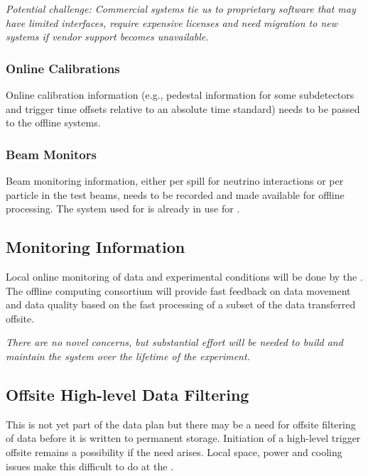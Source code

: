 \documentclass[../main-v1.tex]{subfiles}
\begin{document}
{\it Potential challenge: Commercial  systems tie us to proprietary software that may have limited interfaces, require expensive licenses and need migration to new systems if %
vendor support becomes unavailable.}

\subsubsection{Online Calibrations}
Online calibration information (e.g., pedestal information for some subdetectors and trigger time offsets relative to an absolute time standard) needs to be passed to the offline systems. 


\subsubsection{Beam Monitors}
Beam monitoring information, either per spill for neutrino interactions or per particle in the  test beams, needs to be recorded and made available for offline processing. 
The  system used for  is already in use for .

\subsection{Monitoring Information} 
Local online monitoring of data and experimental conditions will be done by the . %
The offline computing consortium will provide fast feedback on data movement and data quality based on the fast processing of a subset of the data transferred offsite. %

{\it There are no novel concerns, but substantial effort will be needed to build and maintain the system over the lifetime of the experiment.}


\subsection{Offsite High-level Data Filtering}

This is not yet part of the data plan but there may be a need for offsite filtering of data before %
it is written to permanent storage. 
 Initiation of a high-level trigger offsite remains a possibility if the need arises. Local space, power and cooling issues make this difficult to do at the .
\end{document}
